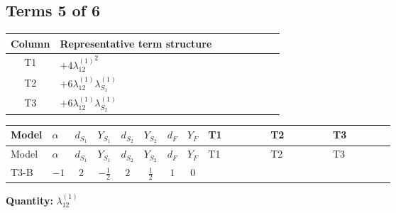 \documentclass[8pt]{article}
\begin{document}
\begin{landscape}
\subsection*{Terms 5 of 6}
\begin{center}
\begin{tabular}{@{}c >{\raggedright\arraybackslash}p{0.82\linewidth}@{}}
\toprule
Column & Representative term structure \\
\midrule
T1 & \(\displaystyle +4 {\lambda_{12}^{(1)}}^2\) \\
\midrule
T2 & \(\displaystyle +6 {\lambda_{12}^{(1)}} {\lambda_{S_1}^{(1)}}\) \\
\midrule
T3 & \(\displaystyle +6 {\lambda_{12}^{(1)}} {\lambda_{S_2}^{(1)}}\) \\
\midrule
\bottomrule
\end{tabular}
\end{center}
\smallskip
\tiny
\begin{longtable}{@{}llcccccc >{\raggedright\arraybackslash}p{0.21\linewidth} >{\raggedright\arraybackslash}p{0.21\linewidth} >{\raggedright\arraybackslash}p{0.21\linewidth}@{}}
\toprule
Model & $\alpha$ & $d_{S_1}$ & $Y_{S_1}$ & $d_{S_2}$ & $Y_{S_2}$ & $d_F$ & $Y_F$ & T1 & T2 & T3 \\
\midrule
\endfirsthead
\toprule
Model & $\alpha$ & $d_{S_1}$ & $Y_{S_1}$ & $d_{S_2}$ & $Y_{S_2}$ & $d_F$ & $Y_F$ & T1 & T2 & T3 \\
\midrule
\endhead
T3-B & $-1$ & $2$ & $-\frac{1}{2}$ & $2$ & $\frac{1}{2}$ & $1$ & $0$ & \scriptsize\adjustbox{max width=\linewidth}{$\begin{gathered} +4 {\lambda_{12}^{(1)}}^2\end{gathered}$} & \scriptsize\adjustbox{max width=\linewidth}{$\begin{gathered} +6 {\lambda_{12}^{(1)}} {\lambda_{S_1}^{(1)}}\end{gathered}$} & \scriptsize\adjustbox{max width=\linewidth}{$\begin{gathered} +6 {\lambda_{12}^{(1)}} {\lambda_{S_2}^{(1)}}\end{gathered}$} \\
\midrule
\bottomrule
\end{longtable}
\clearpage
\noindent\textbf{Quantity: }$\lambda_{12}^{(1)}$\par\smallskip

\end{landscape}
\end{document}
